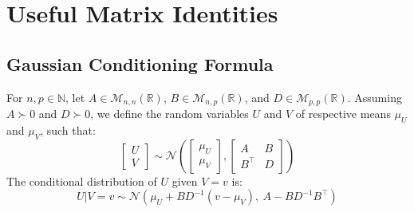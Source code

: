 \chapter{Useful Matrix Identities}

\vfill
\localtableofcontents
\vfill
\newpage

\section{Gaussian Conditioning Formula}

\begin{proposition}\label{th:Gaussian_conditioning}
	For $n,p\in\mathbb{N}$, let $A\in\mathcal{M}_{n,n}(\mathbb{R})$, $B\in\mathcal{M}_{n,p}(\mathbb{R})$, and $D\in\mathcal{M}_{p,p}(\mathbb{R})$. Assuming $A\succ0$ and $D\succ0$, we define the random variables $U$ and $V$ of respective means $\mu_U$ and $\mu_V$, such that:
	\begin{equation}
		\begin{bmatrix}U\\V\end{bmatrix}\sim\mathcal{N}\left(\begin{bmatrix}\mu_U\\\mu_V\end{bmatrix},\begin{bmatrix}A&B\\B^\top&D\end{bmatrix}\right)
	\end{equation}
	The conditional distribution of $U$ given $V=v$ is:
	\begin{equation}
		U|V=v\sim\mathcal{N}\left(\mu_U+BD^{-1}(v-\mu_V),\:A-BD^{-1}B^\top\right)\label{eq:Gaussian_conditioning}
	\end{equation}
\end{proposition}

